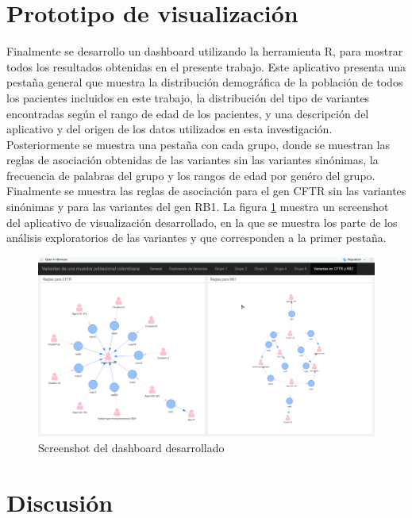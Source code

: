 \section{Prototipo de visualización}

Finalmente se desarrollo un dashboard utilizando la herramienta R, para mostrar todos los resultados obtenidas en el presente trabajo. Este aplicativo presenta una pestaña general que muestra la distribución demográfica de la población de todos los pacientes incluidos en este trabajo, la distribución del tipo de variantes encontradas según el rango de edad de los pacientes, y una descripción del aplicativo y del origen de los datos utilizados en esta investigación. Posteriormente se muestra una pestaña con cada grupo, donde se muestran las reglas de asociación obtenidas de las variantes sin las variantes sinónimas, la frecuencia de palabras del grupo y los rangos de edad por genéro del grupo. Finalmente se muestra las reglas de asociación para el gen CFTR  sin las variantes sinónimas y para las variantes del gen RB1. La figura \ref{fig:dash} muestra un screenshot  del aplicativo de visualización desarrollado, en la que se muestra los parte de los análisis exploratorios de las variantes y que corresponden a la primer pestaña.

\begin{figure}[H]
	\centering
	\includegraphics[width=1\textwidth]{Kap4/dash}
	\caption{Screenshot del dashboard desarrollado} \label{fig:dash}
\end{figure}

\section{Discusión}

